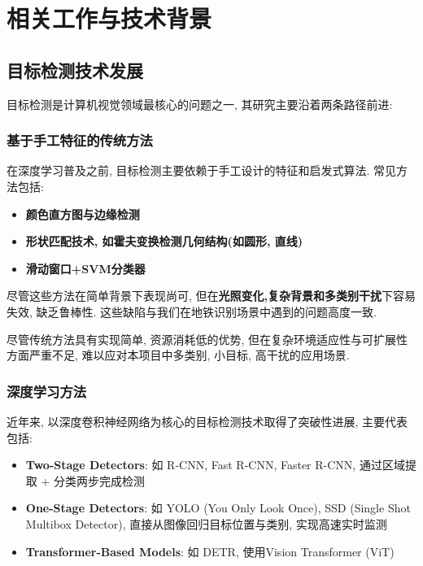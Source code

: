 \documentclass[12pt,a4paper]{article}
\begin{document}
\newpage

\section{相关工作与技术背景}

\subsection{目标检测技术发展}

目标检测是计算机视觉领域最核心的问题之一, 其研究主要沿着两条路径前进:

\subsubsection{基于手工特征的传统方法}

在深度学习普及之前, 目标检测主要依赖于手工设计的特征和启发式算法. 常见方法包括:

\begin{itemize}
    \item \textbf{颜色直方图与边缘检测}
    \item \textbf{形状匹配技术, 如霍夫变换检测几何结构(如圆形, 直线)}
    \item \textbf{滑动窗口+SVM分类器}
\end{itemize}

尽管这些方法在简单背景下表现尚可, 但在\textbf{光照变化,复杂背景和多类别干扰}下容易失效, 缺乏鲁棒性. 这些缺陷与我们在地铁识别场景中遇到的问题高度一致.

尽管传统方法具有实现简单, 资源消耗低的优势, 但在复杂环境适应性与可扩展性方面严重不足, 难以应对本项目中多类别, 小目标, 高干扰的应用场景.

\subsubsection{深度学习方法}

近年来, 以深度卷积神经网络为核心的目标检测技术取得了突破性进展, 主要代表包括:

\begin{itemize}
    \item \textbf{Two-Stage Detectors}: 如 R-CNN, Fast R-CNN, Faster R-CNN, 通过区域提取 + 分类两步完成检测
    \item \textbf{One-Stage Detectors}: 如 YOLO (You Only Look Once), SSD (Single Shot Multibox Detector), 直接从图像回归目标位置与类别, 实现高速实时监测
    \item \textbf{Transformer-Based Models}: 如 DETR, 使用Vision Transformer (ViT)
\end{itemize}
\end{document}

